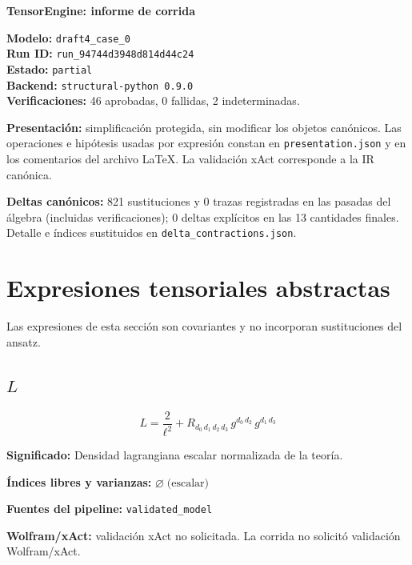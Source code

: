 \documentclass[11pt]{article}
\begin{document}
\begin{center}
{\Large\bfseries TensorEngine: informe de corrida}
\end{center}
\textbf{Modelo:} \texttt{draft4\_case\_0}\\
\textbf{Run ID:} \texttt{run\_94744d3948d814d44c24}\\
\textbf{Estado:} \texttt{partial}\\
\textbf{Backend:} \texttt{structural-python 0.9.0}\\
\textbf{Verificaciones:} 46 aprobadas, 0 fallidas, 2 indeterminadas.
\par\smallskip
\textbf{Presentación:} simplificación protegida, sin modificar los objetos canónicos. Las operaciones e hipótesis usadas por expresión constan en \texttt{presentation.json} y en los comentarios del archivo LaTeX. La validación xAct corresponde a la IR canónica.\par
\textbf{Deltas canónicos:} 821 sustituciones y 0 trazas registradas en las pasadas del álgebra (incluidas verificaciones); 0 deltas explícitos en las 13 cantidades finales. Detalle e índices sustituidos en \texttt{delta\_contractions.json}.\par
\section*{Expresiones tensoriales abstractas}
Las expresiones de esta sección son covariantes y no incorporan sustituciones del ansatz.
\subsection*{$ L $}
\begin{dmath*}[breakdepth={5}]
L = \frac{2}{{\ell}^{2}} + R{}_{d_{0}\,d_{1}\,d_{2}\,d_{3}}\,g{}^{d_{0}\,d_{2}}\,g{}^{d_{1}\,d_{3}}
\end{dmath*}
\par\vspace{1.2\baselineskip}\noindent
\begin{minipage}{\linewidth}
\textbf{Significado:} Densidad lagrangiana escalar normalizada de la teoría.\par
\textbf{Índices libres y varianzas:} $ \varnothing\;\text{(escalar)} $\par
\textbf{Fuentes del pipeline:} \texttt{validated\_model}\par
\textbf{Wolfram/xAct:} validación xAct no solicitada. La corrida no solicitó validación Wolfram/xAct.\par
\end{minipage}
\end{document}
